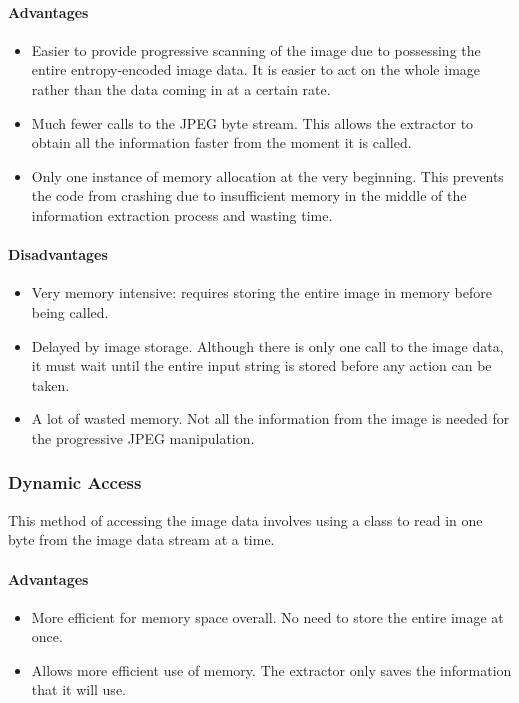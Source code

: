 \paragraph*{Advantages}
\begin{itemize}
	\item Easier to provide progressive scanning of the image due to possessing the entire entropy-encoded image data. It is 
		easier to act on the whole image rather than the data coming in at a certain rate.
	\item Much fewer calls to the JPEG byte stream. This allows the extractor to obtain all the information faster from the moment it is called.
	\item Only one instance of memory allocation at the very beginning. 
		This prevents the code from crashing due to insufficient memory in the middle of the information extraction process and wasting time.
\end{itemize}

\paragraph*{Disadvantages}
\begin{itemize}
	\item Very memory intensive: requires storing the entire image in memory before being called.
	\item Delayed by image storage. Although there is only one call to the image data, it 
		must wait until the entire input string is stored before any action can be taken.
	\item A lot of wasted memory. Not all the information from the image is needed for the progressive JPEG manipulation.
\end{itemize}

\subsubsection{Dynamic Access}

This method of accessing the image data involves using a class to read in one byte from the image data stream at a time.

\paragraph*{Advantages}
\begin{itemize}
	\item More efficient for memory space overall. No need to store the entire image at once.
	\item Allows more efficient use of memory. The extractor only saves the information that it will use.
\end{itemize}

